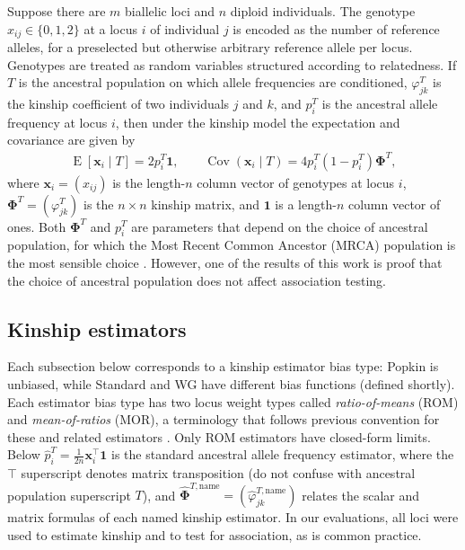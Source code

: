 \documentclass[9pt,twocolumn,twoside]{gsajnl}
\newcommand{\xij}[1][j]{x_{i#1}}
\newcommand{\pit}{p_i^T}
\newcommand{\pith}{\hat{p}_i^T}
\newcommand{\kt}[1][k]{\varphi_{j#1}^T}
\newcommand{\ktHatNamed}[2][k]{\hat{\varphi}_{j#1}^{T,\text{#2}}}
\newcommand{\kinMat}[1][T]{\mathbf{\Phi}^{#1}}
\newcommand{\kinMatEstNamed}[1]{\mathbf{\hat{\Phi}}^{T,\text{#1}}}
\DeclareMathOperator{\E}{E}
\DeclareMathOperator{\Cov}{Cov}
\begin{document}
Suppose there are $m$ biallelic loci and $n$ diploid individuals.
The genotype $\xij \in \{0,1,2\}$ at a locus $i$ of individual $j$ is encoded as the number of reference alleles, for a preselected but otherwise arbitrary reference allele per locus.
Genotypes are treated as random variables structured according to relatedness.
If $T$ is the ancestral population on which allele frequencies are conditioned, $\kt$ is the kinship coefficient of two individuals $j$ and $k$, and $\pit$ is the ancestral allele frequency at locus $i$, then under the kinship model \citep{malecot_mathematiques_1948, wright_genetical_1949, jacquard_structures_1970, astle_population_2009, ochoa_estimating_2021} the expectation and covariance are given by
\begin{align*}
  \E \left[ \mathbf{x}_i \middle| T \right]
  =
    2 \pit \mathbf{1}
  ,
  \quad\quad
  \Cov \left(\mathbf{x}_i \middle| T \right)
  =
    4 \pit \left( 1 - \pit \right) \kinMat
    ,
\end{align*}
where $\mathbf{x}_i = (\xij)$ is the length-$n$ column vector of genotypes at locus $i$, $\kinMat = (\kt)$ is the $n \times n$ kinship matrix, and $\mathbf{1}$ is a length-$n$ column vector of ones.
Both $\kinMat$ and $\pit$ are parameters that depend on the choice of ancestral population, for which the Most Recent Common Ancestor (MRCA) population is the most sensible choice \citep{ochoa_estimating_2021}.
However, one of the results of this work is proof that the choice of ancestral population does not affect association testing.

\subsection{Kinship estimators}

Each subsection below corresponds to a kinship estimator bias type: Popkin is unbiased, while Standard and WG have different bias functions (defined shortly).
Each estimator bias type has two locus weight types called \textit{ratio-of-means} (ROM) and \textit{mean-of-ratios} (MOR), a terminology that follows previous convention for these and related estimators \citep{bhatia_estimating_2013, ochoa_estimating_2021}.
Only ROM estimators have closed-form limits.
Below
$
\pith
=
\frac{1}{2n} \mathbf{x}_i^\intercal \mathbf{1}
$
is the standard ancestral allele frequency estimator,
where the $\intercal$ superscript denotes matrix transposition (do not confuse with ancestral population superscript $T$),
and
$\kinMatEstNamed{name} = (\ktHatNamed{name})$
relates the scalar and matrix formulas of each named kinship estimator.
In our evaluations, all loci were used to estimate kinship and to test for association, as is common practice.
\end{document}
